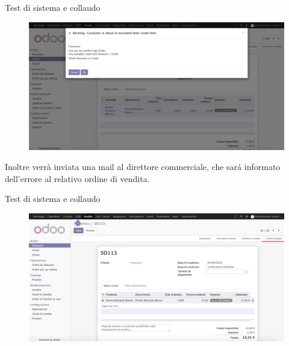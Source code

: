 \documentclass{beamer}
\begin{document}
\begin{frame}{Test di sistema e collaudo}

\begin{figure}[H]
	\begin{center} \includegraphics[width=0.95\linewidth]{figures/check_limit}
	\end{center}
\end{figure}
Inoltre verrà inviata una mail al direttore commerciale, che sar\'a informato dell'errore al relativo ordine di vendita.
\end{frame}


\begin{frame}{Test di sistema e collaudo}

\begin{figure}[H]
	\begin{center} \includegraphics[width=1\linewidth]{figures/second_test}
	\end{center}
\end{figure}

\end{frame}

%
%
\end{document}
